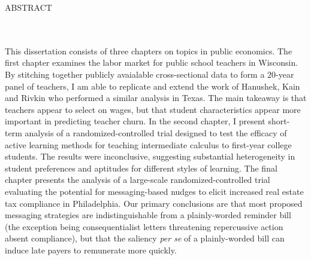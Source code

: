 \begin{center}
    ABSTRACT\\
    \thetitle\\
    \vspace{.5in}
    \theauthor\\
    \theadvisor
\end{center}

\doublespaced
\noindent

This dissertation consists of three chapters on topics in public economics. The first chapter examines the labor market for public school teachers in Wisconsin. By stitching together publicly avaialable cross-sectional data to form a 20-year panel of teachers, I am able to replicate and extend the work of Hanushek, Kain and Rivkin who performed a similar analysis in Texas. The main takeaway is that teachers appear to select on wages, but that student characteristics appear more important in predicting teacher churn. In the second chapter, I present short-term analysis of a randomized-controlled trial designed to test the efficacy of active learning methods for teaching intermediate calculus to first-year college students. The results were inconclusive, suggesting substantial heterogeneity in student preferences and aptitudes for different styles of learning. The final chapter presents the analysis of a large-scale randomized-controlled trial evaluating the potential for messaging-based nudges to elicit increased real estate tax compliance in Philadelphia. Our primary conclusions are that most proposed messaging strategies are indistinguishable from a plainly-worded reminder bill (the exception being consequentialist letters threatening repercussive action absent compliance), but that the saliency \textit{per se} of a plainly-worded bill can induce late payers to remunerate more quickly.
